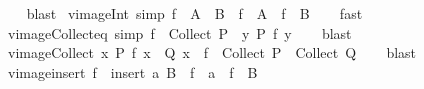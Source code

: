\begin{isabellebody}
%
\isadelimproof
\ \ %
\endisadelimproof
%
\isatagproof
{}\isamarkupfalse%
\ blast%
\endisatagproof
{\isafoldproof}%
%
\isadelimproof
\isanewline
%
\endisadelimproof
\isanewline
{}\isamarkupfalse%
\ vimage{\isacharunderscore}{\kern0pt}Int\ {\isacharbrackleft}{\kern0pt}simp{\isacharbrackright}{\kern0pt}{\isacharcolon}{\kern0pt}\ {\isachardoublequoteopen}f\ {\isacharminus}{\kern0pt}{\isacharbackquote}{\kern0pt}\ {\isacharparenleft}{\kern0pt}A\ {\isasyminter}\ B{\isacharparenright}{\kern0pt}\ {\isacharequal}{\kern0pt}\ {\isacharparenleft}{\kern0pt}f\ {\isacharminus}{\kern0pt}{\isacharbackquote}{\kern0pt}\ A{\isacharparenright}{\kern0pt}\ {\isasyminter}\ {\isacharparenleft}{\kern0pt}f\ {\isacharminus}{\kern0pt}{\isacharbackquote}{\kern0pt}\ B{\isacharparenright}{\kern0pt}{\isachardoublequoteclose}\isanewline
%
\isadelimproof
\ \ %
\endisadelimproof
%
\isatagproof
{}\isamarkupfalse%
\ fast%
\endisatagproof
{\isafoldproof}%
%
\isadelimproof
\isanewline
%
\endisadelimproof
\isanewline
{}\isamarkupfalse%
\ vimage{\isacharunderscore}{\kern0pt}Collect{\isacharunderscore}{\kern0pt}eq\ {\isacharbrackleft}{\kern0pt}simp{\isacharbrackright}{\kern0pt}{\isacharcolon}{\kern0pt}\ {\isachardoublequoteopen}f\ {\isacharminus}{\kern0pt}{\isacharbackquote}{\kern0pt}\ Collect\ P\ {\isacharequal}{\kern0pt}\ {\isacharbraceleft}{\kern0pt}y{\isachardot}{\kern0pt}\ P\ {\isacharparenleft}{\kern0pt}f\ y{\isacharparenright}{\kern0pt}{\isacharbraceright}{\kern0pt}{\isachardoublequoteclose}\isanewline
%
\isadelimproof
\ \ %
\endisadelimproof
%
\isatagproof
{}\isamarkupfalse%
\ blast%
\endisatagproof
{\isafoldproof}%
%
\isadelimproof
\isanewline
%
\endisadelimproof
\isanewline
{}\isamarkupfalse%
\ vimage{\isacharunderscore}{\kern0pt}Collect{\isacharcolon}{\kern0pt}\ {\isachardoublequoteopen}{\isacharparenleft}{\kern0pt}{\isasymAnd}x{\isachardot}{\kern0pt}\ P\ {\isacharparenleft}{\kern0pt}f\ x{\isacharparenright}{\kern0pt}\ {\isacharequal}{\kern0pt}\ Q\ x{\isacharparenright}{\kern0pt}\ {\isasymLongrightarrow}\ f\ {\isacharminus}{\kern0pt}{\isacharbackquote}{\kern0pt}\ {\isacharparenleft}{\kern0pt}Collect\ P{\isacharparenright}{\kern0pt}\ {\isacharequal}{\kern0pt}\ Collect\ Q{\isachardoublequoteclose}\isanewline
%
\isadelimproof
\ \ %
\endisadelimproof
%
\isatagproof
{}\isamarkupfalse%
\ blast%
\endisatagproof
{\isafoldproof}%
%
\isadelimproof
\isanewline
%
\endisadelimproof
\isanewline
{}\isamarkupfalse%
\ vimage{\isacharunderscore}{\kern0pt}insert{\isacharcolon}{\kern0pt}\ {\isachardoublequoteopen}f\ {\isacharminus}{\kern0pt}{\isacharbackquote}{\kern0pt}\ {\isacharparenleft}{\kern0pt}insert\ a\ B{\isacharparenright}{\kern0pt}\ {\isacharequal}{\kern0pt}\ {\isacharparenleft}{\kern0pt}f\ {\isacharminus}{\kern0pt}{\isacharbackquote}{\kern0pt}\ {\isacharbraceleft}{\kern0pt}a{\isacharbraceright}{\kern0pt}{\isacharparenright}{\kern0pt}\ {\isasymunion}\ {\isacharparenleft}{\kern0pt}f\ {\isacharminus}{\kern0pt}{\isacharbackquote}{\kern0pt}\ B{\isacharparenright}{\kern0pt}{\isachardoublequoteclose}\isanewline

\end{isabellebody}
